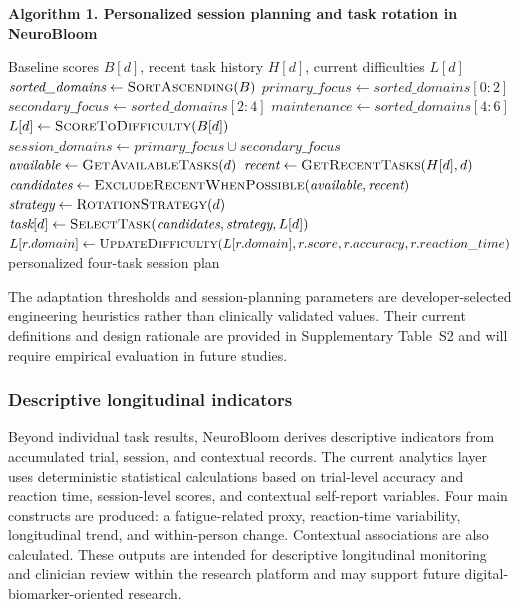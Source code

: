 \documentclass[preprint,12pt,a4paper]{elsarticle}
\begin{document}
\begin{center}
\begin{minipage}{0.92\linewidth}
\small
\textbf{Algorithm 1. Personalized session planning and task rotation in NeuroBloom}
\begin{algorithmic}[1]
\Require Baseline scores $B[d]$, recent task history $H[d]$, current difficulties $L[d]$
\State $\textit{sorted\_domains} \gets \Call{SortAscending}{B}$
\State $\textit{primary\_focus} \gets \textit{sorted\_domains}[0:2]$
\State $\textit{secondary\_focus} \gets \textit{sorted\_domains}[2:4]$
\State $\textit{maintenance} \gets \textit{sorted\_domains}[4:6]$
    \State $L[d] \gets \Call{ScoreToDifficulty}{B[d]}$
\EndFor
\State $\textit{session\_domains} \gets
\textit{primary\_focus} \cup \textit{secondary\_focus}$
    \State $\textit{available} \gets \Call{GetAvailableTasks}{d}$
    \State $\textit{recent} \gets \Call{GetRecentTasks}{H[d], d}$
    \State $\textit{candidates} \gets
    \Call{ExcludeRecentWhenPossible}{\textit{available}, \textit{recent}}$
    \State $\textit{strategy} \gets \Call{RotationStrategy}{d}$
    \State $\textit{task}[d] \gets
    \Call{SelectTask}{\textit{candidates}, \textit{strategy}, L[d]}$
\EndFor
{}
    \State {}
    \State $L[r.domain] \gets
    \Call{UpdateDifficulty}{L[r.domain], r.score, r.accuracy, r.reaction\_time}$
\EndFor
{}
    \State {}
\EndIf
\State \Return personalized four-task session plan
\end{algorithmic}
\end{minipage}
\end{center}

The adaptation thresholds and session-planning parameters are developer-selected
engineering heuristics rather than clinically validated values. Their current
definitions and design rationale are provided in Supplementary Table~S2 and
will require empirical evaluation in future studies.

\subsubsection{Descriptive longitudinal indicators}

Beyond individual task results, NeuroBloom derives descriptive indicators
from accumulated trial, session, and contextual records. The current
analytics layer uses deterministic statistical calculations based on
trial-level accuracy and reaction time, session-level scores, and contextual
self-report variables. Four main constructs are produced: a fatigue-related
proxy, reaction-time variability, longitudinal trend, and within-person
change. Contextual associations are also calculated. These outputs are intended for descriptive longitudinal monitoring and clinician review within the research platform and may support future digital-biomarker-oriented research.
\end{document}
